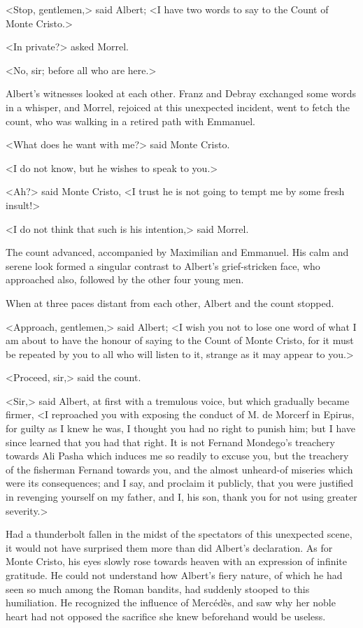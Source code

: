  <Stop, gentlemen,> said Albert; <I have two words to say to the Count of Monte Cristo.> 

 <In private?> asked Morrel. 

 <No, sir; before all who are here.> 

 Albert's witnesses looked at each other. Franz and Debray exchanged some words in a whisper, and Morrel, rejoiced at this unexpected incident, went to fetch the count, who was walking in a retired path with Emmanuel. 

 <What does he want with me?> said Monte Cristo. 

 <I do not know, but he wishes to speak to you.> 

 <Ah?> said Monte Cristo, <I trust he is not going to tempt me by some fresh insult!> 

 <I do not think that such is his intention,> said Morrel. 

 The count advanced, accompanied by Maximilian and Emmanuel. His calm and serene look formed a singular contrast to Albert's grief-stricken face, who approached also, followed by the other four young men. 

 When at three paces distant from each other, Albert and the count stopped. 

 <Approach, gentlemen,> said Albert; <I wish you not to lose one word of what I am about to have the honour of saying to the Count of Monte Cristo, for it must be repeated by you to all who will listen to it, strange as it may appear to you.> 

 <Proceed, sir,> said the count. 

 <Sir,> said Albert, at first with a tremulous voice, but which gradually became firmer, <I reproached you with exposing the conduct of M. de Morcerf in Epirus, for guilty as I knew he was, I thought you had no right to punish him; but I have since learned that you had that right. It is not Fernand Mondego's treachery towards Ali Pasha which induces me so readily to excuse you, but the treachery of the fisherman Fernand towards you, and the almost unheard-of miseries which were its consequences; and I say, and proclaim it publicly, that you were justified in revenging yourself on my father, and I, his son, thank you for not using greater severity.> 

 Had a thunderbolt fallen in the midst of the spectators of this unexpected scene, it would not have surprised them more than did Albert's declaration. As for Monte Cristo, his eyes slowly rose towards heaven with an expression of infinite gratitude. He could not understand how Albert's fiery nature, of which he had seen so much among the Roman bandits, had suddenly stooped to this humiliation. He recognized the influence of Mercédès, and saw why her noble heart had not opposed the sacrifice she knew beforehand would be useless. 

